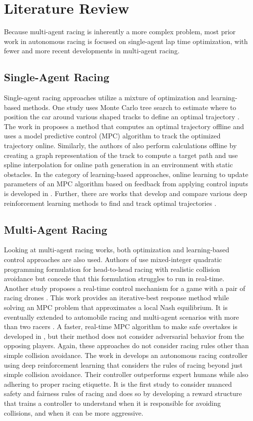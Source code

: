 \chapter{Literature Review} \label{chapter:litreview}
Because multi-agent racing is inherently a more complex problem, most prior work in autonomous racing is focused on single-agent lap time optimization, with fewer and more recent developments in multi-agent racing.
\section{Single-Agent Racing} 
Single-agent racing approaches utilize a mixture of optimization and learning-based methods. One study uses Monte Carlo tree search to estimate where to position the car around various shaped tracks to define an optimal trajectory \cite{mctsracing}. The work in \cite{vazquez2020optimizationbased} proposes a method that computes an optimal trajectory offline and uses a model predictive control (MPC) algorithm to track the optimized trajectory online. Similarly, the authors of \cite{graphtraj} also perform calculations offline by creating a graph representation of the track to compute a target path and use spline interpolation for online path generation in an environment with static obstacles. In the category of learning-based approaches, online learning to update parameters of an MPC algorithm based on feedback from applying control inputs is developed in \cite{learningmpc}. Further, there are works that develop and compare various deep reinforcement learning methods to find and track optimal trajectories \cite{deeprl1, deeprl2}. 
\section{Multi-Agent Racing}
Looking at multi-agent racing works, both optimization and learning-based control approaches are also used. Authors of \cite{maqp} use mixed-integer quadratic programming formulation for head-to-head racing with realistic collision avoidance but concede that this formulation struggles to run in real-time. Another study proposes a real-time control mechanism for a game with a pair of racing drones \cite{spica2018realtime}. This work provides an iterative-best response method while solving an MPC problem that approximates a local Nash equilibrium. It is eventually extended to automobile racing \cite{wang2019game} and multi-agent scenarios with more than two racers \cite{wang2021game}. A faster, real-time MPC algorithm to make safe overtakes is developed in \cite{nonadvovertaking}, but their method does not consider adversarial behavior from the opposing players. Again, these approaches do not consider racing rules other than simple collision avoidance. The work in \cite{sonyai} develops an autonomous racing controller using deep reinforcement learning that considers the rules of racing beyond just simple collision avoidance. Their controller outperforms expert humans while also adhering to proper racing etiquette. It is the first study to consider nuanced safety and fairness rules of racing and does so by developing a reward structure that trains a controller to understand when it is responsible for avoiding collisions, and when it can be more aggressive. 

